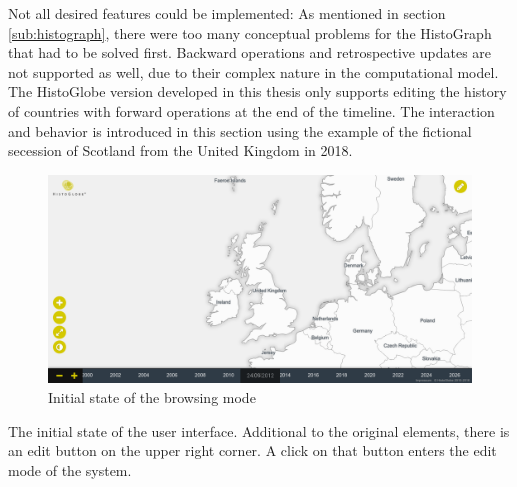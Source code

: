 Not all desired features could be implemented:
As mentioned in section \ref{sub:histograph}, there were too many conceptual problems for the HistoGraph that had to be solved first.
Backward operations and retrospective updates are not supported as well, due to their complex nature in the computational model. The HistoGlobe version developed in this thesis only supports editing the history of countries with forward operations at the end of the timeline. The interaction and behavior is introduced in this section using the example of the fictional secession of Scotland from the United Kingdom in 2018.

\newpage
\begin{minipage}[t]{0.47\textwidth}

  \begin{figure}[H]
    \centering
    \includegraphics[width=1.0\textwidth]{graphics/development/user_interface_design_process/1_init.png}
    \caption{Initial state of the browsing mode}
    \label{fig:final_1_init}
  \end{figure}

  The initial state of the user interface. Additional to the original elements, there is an edit button on the upper right corner. A click on that button enters the edit mode of the system.

\end{minipage}    %
\hspace{1.5em}    %
